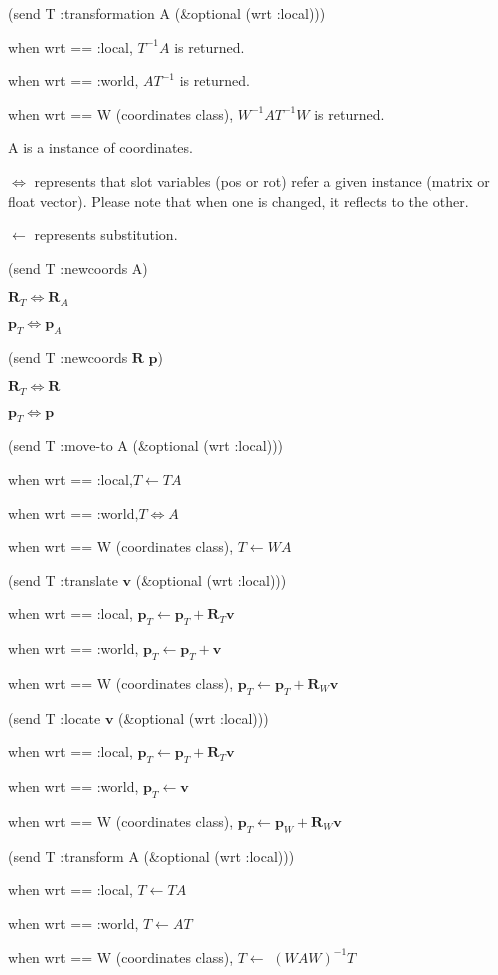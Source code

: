\noindent
(send T :transformation A (\&optional (wrt :local)))

when wrt == :local, $T^{-1}A$ is returned.

when wrt == :world, $AT^{-1}$ is returned.

when wrt == W (coordinates class), $W^{-1}AT^{-1}W$ is returned.


\vspace{1ex}

\noindent
A is a instance of coordinates.

\noindent

$\Leftrightarrow$ represents that
slot variables (pos or rot) refer a given instance (matrix or float vector).
Please note that when one is changed, it reflects to the other.


\noindent
$\leftarrow$ represents substitution.

\noindent
(send T :newcoords A)

$\mathbf{R}_T \Leftrightarrow \mathbf{R}_A$

$\mathbf{p}_T \Leftrightarrow \mathbf{p}_A$

\noindent
(send T :newcoords $\mathbf{R}$ $\mathbf{p}$)

$\mathbf{R}_T \Leftrightarrow \mathbf{R}$

$\mathbf{p}_T \Leftrightarrow \mathbf{p}$

\noindent
(send T :move-to A (\&optional (wrt :local)))

when wrt == :local,$T \leftarrow TA$

when wrt == :world,$T \Leftrightarrow A$

when wrt == W (coordinates class), $T \leftarrow WA$

\noindent
(send T :translate $\mathbf{v}$ (\&optional (wrt :local)))

when wrt == :local,
$\mathbf{p}_{T} \leftarrow \mathbf{p}_{T} + \mathbf{R}_{T}\mathbf{v}$

when wrt == :world,
$\mathbf{p}_{T} \leftarrow \mathbf{p}_{T} + \mathbf{v}$

when wrt == W (coordinates class),
$\mathbf{p}_{T} \leftarrow \mathbf{p}_{T} + \mathbf{R}_{W}\mathbf{v}$

\noindent
(send T :locate $\mathbf{v}$ (\&optional (wrt :local)))

when wrt == :local,
$\mathbf{p}_{T} \leftarrow \mathbf{p}_{T} + \mathbf{R}_{T} \mathbf{v}$

when wrt == :world,
$\mathbf{p}_{T} \leftarrow \mathbf{v}$

when wrt == W (coordinates class),
$\mathbf{p}_{T} \leftarrow \mathbf{p}_{W} + \mathbf{R}_{W}\mathbf{v}$

\noindent
(send T :transform A (\&optional (wrt :local)))

when wrt == :local, $T \leftarrow TA$

when wrt == :world, $T \leftarrow AT$

when wrt == W (coordinates class), $T \leftarrow$ $\left( WAW \right)^{-1} T$

\newpage


